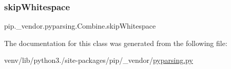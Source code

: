 \subsubsection{\texorpdfstring{skip\+Whitespace}{skipWhitespace}}
{\footnotesize\ttfamily pip.\+\_\+vendor.\+pyparsing.\+Combine.\+skip\+Whitespace}



The documentation for this class was generated from the following file\+:\begin{DoxyCompactItemize}
\item 
venv/lib/python3./site-\/packages/pip/\+\_\+vendor/\hyperlink{pip_2__vendor_2pyparsing_8py}{pyparsing.\+py}\end{DoxyCompactItemize}
